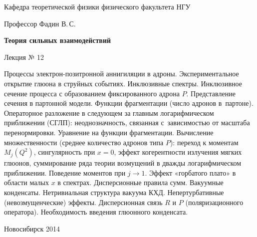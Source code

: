 \documentclass[12pt,pagesize,paper=192mm:108mm]{scrbook}
\begin{document}
\begin{titlepage}
\begin{center}
    Кафедра теоретической физики физического факультета НГУ

    \large
    Профессор Фадин В.\,С.
    \vspace{-0.5em}

    \huge
    \textbf{Теория сильных взаимодействий}
    
    \Large
    Лекция № 12
    \vfill
    
    \normalsize
    \begin{minipage}{0.93\linewidth}
      \small Процессы электрон-позитронной аннигиляции в
      адроны. Экспериментальное открытие глюона в струйных
      событиях. Инклюзивные спектры. Инклюзивное сечение процесса с
      образованием фиксированного адрона $P$. Представление сечения в
      партонной модели. Функции фрагментации (число адронов
      в~партоне). Операторное разложение в следующем за главным
      логарифмическом приближении (СГЛП): неоднозначность, связанная
      с~зависимостью от масштаба перенормировки. Уравнение на функции
      фрагментации. Вычисление множественности (среднее количество
      адронов типа $P$): переход к моментам $M_j(Q^2)$, сингулярность
      при $x=0$, эффект когерентности излучения мягких глюонов,
      суммирование ряда теории возмущений в дважды логарифмическом
      приближении. Поведение моментов при $j\to 1$. Эффект «горбатого
      плато» в области малых $x$ в спектрах. Дисперсионные правила
      сумм. Вакуумные конденсаты. Нетривиальная структура вакуума
      КХД. Непертурбативные (невозмущенческие) эффекты. Дисперсионная
      связь $R$ и $P$ (поляризационного оператора). Необходимость
      введения глюонного конденсата.
    \end{minipage}
    \vfill
    
    \normalsize \ccbysa\hspace{0.5em} Новосибирск 2014   
  \end{center}
\end{titlepage}
\end{document}
